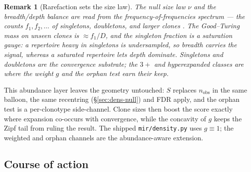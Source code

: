 \documentclass[11pt]{article}
\theoremstyle{oldplain}
\theoremstyle{oldrem}
\newtheorem{remark}{Remark}
\newcommand{\code}[1]{\texttt{#1}}
\begin{document}
\begin{remark}[Rarefaction sets the size law]\label{rem:rarefaction}
The null size law $\nu$ and the breadth/depth balance are read from the frequency-of-frequencies spectrum ---
the counts $f_1,f_2,\dots$ of singletons, doubletons, and larger clones \cite{Good1953}. The Good--Turing mass
on unseen clones is $\approx f_1/D$, and the singleton fraction is a saturation gauge: a repertoire heavy in
singletons is undersampled, so breadth carries the signal, whereas a saturated repertoire lets depth
dominate. Singletons and doubletons are the convergence substrate; the $3{+}$ and hyperexpanded classes are
where the weight $g$ and the orphan test earn their keep.
\end{remark}

This abundance layer leaves the geometry untouched: $S$ replaces $n_{\mathrm{obs}}$ in the same balloon, the
same recentring (\S\ref{sec:dens-null}) and {\scshape FDR} apply, and the orphan test is a per-clonotype
side-channel. Clone sizes then boost the score exactly where expansion co-occurs with convergence, while the
concavity of $g$ keeps the Zipf tail from ruling the result. The shipped \code{mir/density.py} uses
$g\equiv1$; the weighted and orphan channels are the abundance-aware extension.

\subsection{Course of action}\label{sec:dens-algo}
\end{document}
